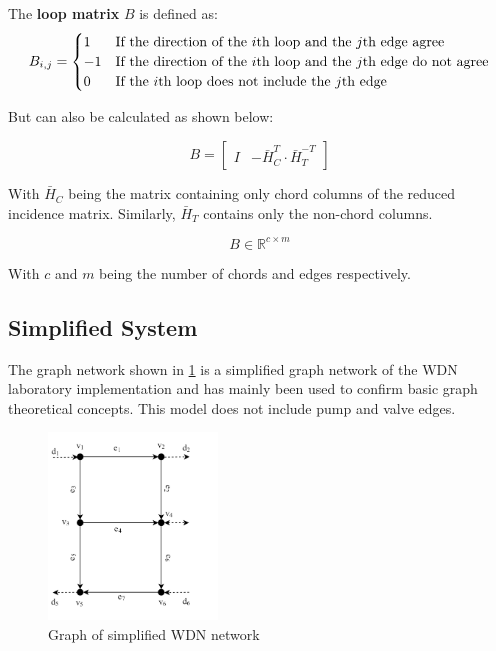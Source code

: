 The \textbf{loop matrix} $B$ is defined as:
\begin{equation*}
	B_{i,j} = \begin{cases}
		1 & \text{If the direction of the $ i $th loop and the} \text{ $j$th edge agree}\\
		-1 & \text{If the direction of the $ i $th loop and the} \text{ $j$th edge do not agree}\\
		0 & \text{If the $ i $th loop does not include the $ j $th edge}\\
	\end{cases}
\end{equation*}

But can also be calculated as shown below:

\begin{equation}\label{eq:LoopMatrix}
	B = \begin{bmatrix}
		I & -\bar{H}_{C}^{T}\cdot\bar{H}_{T}^{-T}
	\end{bmatrix}
\end{equation}

With $\bar{H}_{C}$ being the matrix containing only chord columns of the reduced incidence matrix. Similarly, $\bar{H}_{T}$ contains only the non-chord columns. 

\begin{equation*}
	B\in \mathbb{R}^{c\times m}
\end{equation*}

With $c$ and $m$ being the number of chords and edges respectively.

\newpage
\subsection{Simplified System}
The graph network shown in \cref{fig:graph} is a simplified graph network of the WDN laboratory implementation and has mainly been used to confirm basic graph theoretical concepts. This model does not include pump and valve edges.  

\begin{figure}[h!]
	\centering
	\includegraphics[width=0.4\textwidth]{Pictures/Graph.png}
	\caption{Graph of simplified WDN network \cite{Rathore930}}
	\label{fig:graph}
\end{figure}

